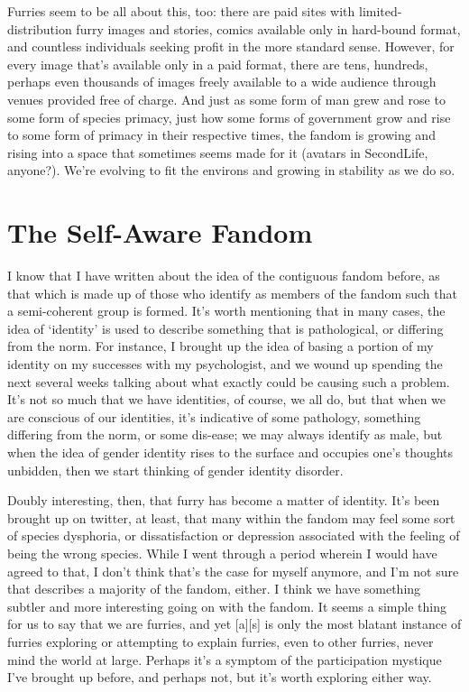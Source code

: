 Furries seem to be all about this, too: there are paid sites with limited-distribution furry images and stories, comics available only in hard-bound format, and countless individuals seeking profit in the more standard sense. However, for every image that's available only in a paid format, there are tens, hundreds, perhaps even thousands of images freely available to a wide audience through venues provided free of charge. And just as some form of man grew and rose to some form of species primacy, just how some forms of government grow and rise to some form of primacy in their respective times, the fandom is growing and rising into a space that sometimes seems made for it (avatars in SecondLife, anyone?). We're evolving to fit the environs and growing in stability as we do so.

\section*{The Self-Aware Fandom}

I know that I have written about the idea of the contiguous fandom before, as that which is made up of those who identify as members of the fandom such that a semi-coherent group is formed. It's worth mentioning that in many cases, the idea of `identity' is used to describe something that is pathological, or differing from the norm. For instance, I brought up the idea of basing a portion of my identity on my successes with my psychologist, and we wound up spending the next several weeks talking about what exactly could be causing such a problem. It's not so much that we have identities, of course, we all do, but that when we are conscious of our identities, it's indicative of some pathology, something differing from the norm, or some dis-ease; we may always identify as male, but when the idea of gender identity rises to the surface and occupies one's thoughts unbidden, then we start thinking of gender identity disorder.

Doubly interesting, then, that furry has become a matter of identity. It's been brought up on twitter, at least, that many within the fandom may feel some sort of species dysphoria, or dissatisfaction or depression associated with the feeling of being the wrong species. While I went through a period wherein I would have agreed to that, I don't think that's the case for myself anymore, and I'm not sure that describes a majority of the fandom, either. I think we have something subtler and more interesting going on with the fandom. It seems a simple thing for us to say that we are furries, and yet {[}a{]}{[}s{]} is only the most blatant instance of furries exploring or attempting to explain furries, even to other furries, never mind the world at large. Perhaps it's a symptom of the participation mystique I've brought up before, and perhaps not, but it's worth exploring either way.

